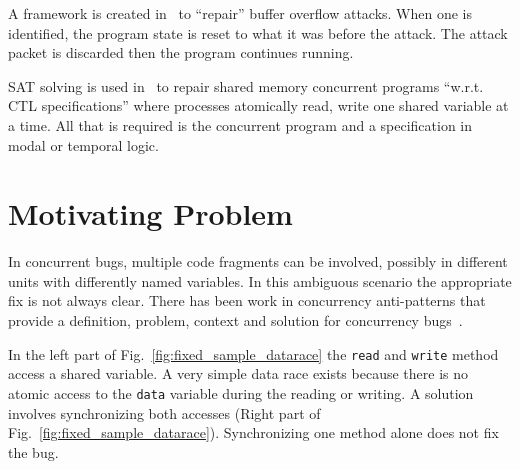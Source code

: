 \documentclass{llncs}
\begin{document}
A framework is created in~\cite{CB05} to ``repair'' buffer overflow attacks.
When one is identified, the program state is reset to what it was before the
attack. The attack packet is discarded then the program continues running.

SAT solving is used in~\cite{AY07}  to repair shared memory concurrent programs
``w.r.t. CTL specifications'' where processes atomically read, write one shared
variable at a time. All that is required is the concurrent program and a
specification in modal or temporal logic.

\section{Motivating Problem}
\label{sec:motivation}

In concurrent bugs, multiple code fragments can be involved, possibly in different units with
differently named variables. In this ambiguous scenario the appropriate fix is
not always clear. There has been work in concurrency anti-patterns that provide
a definition, problem, context and solution for concurrency
bugs~\cite{BJ09,FKLV12}.

In the left part of Fig.~\ref{fig:fixed_sample_datarace} the \texttt{read} and
\texttt{write} method access a shared variable. A very simple data race exists
because there is no atomic access to the \texttt{data} variable during the
reading or writing.
A solution involves synchronizing both accesses (Right part of
Fig.~\ref{fig:fixed_sample_datarace}). Synchronizing one method alone does not
fix the bug.

\end{document}
